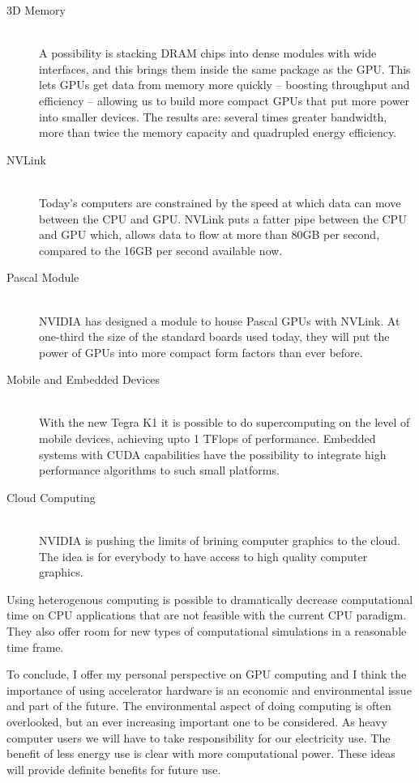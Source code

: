 \begin{description}
  \item[3D Memory] \hfill \\
 A possibility is stacking DRAM chips into dense modules with wide interfaces, and this brings them inside the same package as the GPU. This lets GPUs get data from memory more quickly – boosting throughput and efficiency – allowing us to build more compact GPUs that put more power into smaller devices. The results are: several times greater bandwidth, more than twice the memory capacity and quadrupled energy efficiency.
  
  \item[NVLink] \hfill \\
 Today’s computers are constrained by the speed at which data can move between the CPU and GPU. NVLink puts a fatter pipe between the CPU and GPU which, allows data to flow at more than 80GB per second, compared to the 16GB per second available now.
 
 \item[Pascal Module] \hfill \\ 
  NVIDIA has designed a module to house Pascal GPUs with NVLink. At one-third the size of the standard boards used today, they will put the power of GPUs into more compact form factors than ever before.
  
   \item[Mobile and Embedded Devices] \hfill \\ 
   With the new Tegra K1 it is possible to do supercomputing on the level of mobile devices, achieving upto 1 TFlops of performance. Embedded systems with CUDA capabilities have the possibility to integrate high performance algorithms to such small platforms. 
   
   \item[Cloud Computing] \hfill \\ 
   NVIDIA is pushing the limits of brining computer graphics to the cloud. The idea is for everybody to have access to high quality computer graphics.
 
  \end{description}
  
\vspace{3.5em}


Using heterogenous computing is possible to dramatically decrease computational time on CPU applications that are not feasible with the current CPU paradigm. They also offer room for new types of computational simulations in a reasonable time frame. 

To conclude, I offer my personal perspective on GPU computing and I think the importance of using accelerator hardware is an economic and environmental issue and part of the future. The environmental aspect of doing computing is often overlooked, but an ever increasing important one to be considered. As heavy computer users we will have to take responsibility for our electricity use. The benefit of less energy use is clear with more computational power. These ideas will provide definite benefits for future use.
